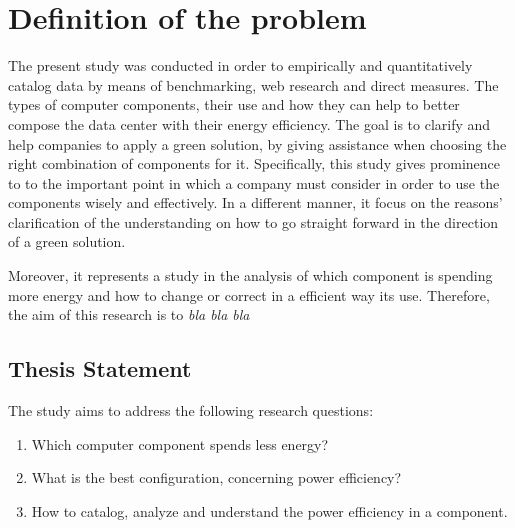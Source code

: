 


\section{Definition of the problem} \label{sec1:problem}
    
    The present study was conducted in order to empirically and quantitatively catalog data by means of benchmarking, web research and direct measures. The types of computer components, their use and how they can help to better compose the data center with their energy efficiency. The goal is to clarify and help companies to apply a green solution, by giving assistance when choosing the right combination of components for it. Specifically, this study gives prominence to to the important point in which a company must consider in order to use the components wisely and effectively. In a different manner, it focus on the reasons' clarification of the understanding on how to go straight forward in the direction of a green solution.
    
    Moreover, it represents a study in the analysis of which component is spending more energy and how to change or correct in a efficient way its use. Therefore, the aim of this research is to \emph{bla bla bla}%
    
    \subsection{Thesis Statement}\label{sec1:thesis_statement}
        The study aims to address the following research questions:
        \begin{enumerate}
	        \item Which computer component spends less energy?
	        \item What is the best configuration, concerning power efficiency?
	        \item How to catalog, analyze and understand the power efficiency in a component.
        \end{enumerate}

